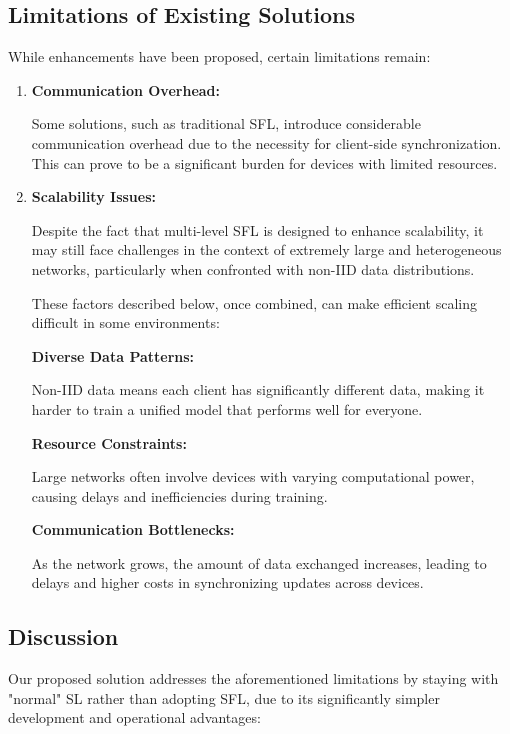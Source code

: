 \subsection{Limitations of Existing Solutions}
\label{sec:limitations_on_existing_solutions}

While enhancements have been proposed, certain limitations remain:

\begin{enumerate}
	\item \textbf{Communication Overhead:}
	
	Some solutions, such as traditional \gls{SFL}, introduce considerable communication overhead due to the necessity for client-side synchronization. This can prove to be a significant burden for devices with limited resources. 
	
	\item \textbf{Scalability Issues:}
	
	Despite the fact that multi-level \gls{SFL} is designed to enhance scalability, it may still face challenges in the context of extremely large and heterogeneous networks, particularly when confronted with non-IID data distributions.
	
	These factors described below, once combined, can make efficient scaling difficult in some environments:
	
	\subitem \textbf{Diverse Data Patterns:}
	
	 Non-IID data means each client has significantly different data, making it harder to train a unified model that performs well for everyone.
	 
	 \subitem \textbf{Resource Constraints:}
	 
	 Large networks often involve devices with varying computational power, causing delays and inefficiencies during training.
	 
	 \subitem \textbf{Communication Bottlenecks:}
	 
	 As the network grows, the amount of data exchanged increases, leading to delays and higher costs in synchronizing updates across devices.

\end{enumerate}


\subsection{Discussion}
\label{sec:sl_improvements_discussion}

Our proposed solution addresses the aforementioned limitations by staying with "normal" \gls{SL} rather than adopting \gls{SFL}, due to its significantly simpler development and operational advantages:

